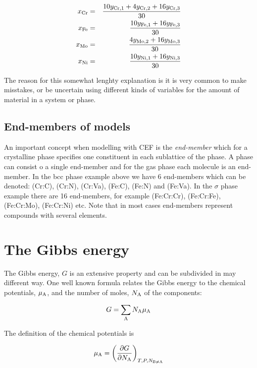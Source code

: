 \documentclass[12pt]{article}
\begin{document}
\begin{eqnarray*}
x_{\rm Cr} &=& \frac{10y_{\rm Cr,1} + 4y_{\rm Cr,2} + 16y_{\rm Cr,3}}{30}\\
x_{\rm Fe} &=& \frac{10y_{\rm Fe,1}+16y_{\rm Fe,3}}{30}\\
x_{\rm Mo} &=& \frac{4y_{\rm Mo,2}+16y_{\rm Mo,3}}{30}\\
x_{\rm Ni} &=& \frac{10y_{\rm Ni,1}+16y_{\rm Ni,3}}{30}
\end{eqnarray*}

The reason for this somewhat lenghty explanation is it is very common
to make misstakes, or be uncertain using different kinds of variables
for the amount of material in a system or phase.

\subsection{End-members of models}

An important concept when modelling with CEF is the {\em end-member}
which for a crystalline phase specifies one constituent in each
sublattice of the phase.  A phase can consist o a single end-member
and for the gas phase each molecule is an end-member.  In the bcc
phase example above we have 6 end-members which can be denoted:
(Cr:C), (Cr:N), (Cr:Va), (Fe:C), (Fe:N) and (Fe:Va).  In the $\sigma$
phase example there are 16 end-members, for example (Fe:Cr:Cr),
(Fe:Cr:Fe), (Fe:Cr:Mo), (Fe:Cr:Ni) etc.  Note that in most cases
end-members represent compounds with several elements.

\section{The Gibbs energy}

The Gibbs energy, $G$ is an extensive property and can be subdivided
in may different way.  One well known formula relates the Gibbs energy
to the chemical potentials, $\mu_{\rm A}$, and the number of moles,
$N_{\rm A}$ of the components:

\begin{equation}
G = \sum_{\rm A} N_{\rm A} \mu_{\rm A} \label{eq:gsummu}
\end{equation}

The definition of the chemical potentials is

\begin{equation}
\mu_{\rm A}=\left(\frac{\partial G}{\partial N_{\rm A}}
\right)_{T,P,N_{\rm B\ne A}} \label{eq:mudef}
\end{equation}
\end{document}
